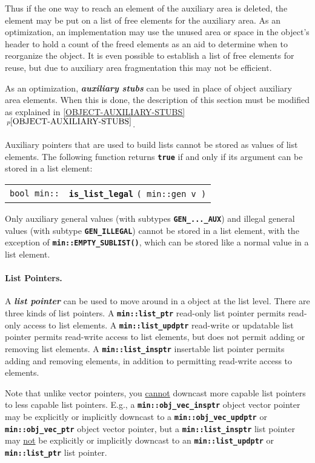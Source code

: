 \documentclass[12pt]{article}
\makeatletter
\newcommand{\subsubsubsection}[1]{\paragraph[#1]{#1.}}
\newcommand{\TT}[1]{{\tt \bfseries #1}}
\newcommand{\key}[1]{{\bf \em #1}\index{#1}}
\newcommand{\skey}[2]{{\bf \em #1#2}\index{#1}}
\newcommand{\ttindex}[1]{\index{#1@{\tt #1}}}
\newcommand{\itemref}[1]{\ref{#1}$\,^{p\pageref{#1}}$}
\newcommand{\EOL}{\penalty \exhyphenpenalty}
\newenvironment{indpar}[1][0.3in]%
	{\begin{list}{}%
		     {\setlength{\itemsep}{0in}%
		      \setlength{\topsep}{0in}%
		      \setlength{\parsep}{1ex}%
		      \setlength{\labelwidth}{#1}%
		      \setlength{\leftmargin}{#1}%
		      \addtolength{\leftmargin}{\labelsep}}%
	 \item}%
	{\end{list}}
\newcommand{\LABEL}[1]{\label{#1}}
\newcommand{\MINKEY}[1]%
	   {\TT{#1}\ttindex{min::#1}\ttindex{#1}}
\makeatother
\begin{document}
Thus if the one way to reach an element of
the auxiliary area is deleted, the element may be put on a list of
free elements for the auxiliary area.  As an optimization,
an implementation may use the unused area or space in the object's header
to hold a count of the freed elements as an aid to determine when to
reorganize the object.  It is even possible to establish a list of
free elements for reuse, but due to auxiliary area fragmentation this
may not be efficient.

As an optimization, \skey{auxiliary stub}s can be used in place of object
auxiliary area elements.  When this is done, the description of this
section must be modified as explained in \itemref{OBJECT-AUXILIARY-STUBS}.

Auxiliary pointers that are used to build lists cannot be stored as
values of list elements.  The following function returns \TT{true}
if and only if its argument can be stored in a list element:

\begin{indpar}\begin{tabular}{r@{}l}
\verb|bool min::|
	& \MINKEY{is\_list\_legal} \verb|( min::gen v )|
\LABEL{MIN::IS_LIST_LEGAL} \\
\end{tabular}\end{indpar}

Only auxiliary general values (with subtypes \TT{GEN\_...\_AUX})
and illegal general values (with subtype \TT{GEN\_ILLEGAL}) cannot be stored
in a list element, with the exception of \TT{min::\EOL EMPTY\_\EOL SUBLIST()},
which can be stored like a normal value in a list element.

\subsubsubsection{List Pointers}
\label{LIST-POINTERS}

A \key{list pointer} can be used to move around in a object at
the list level.
There are three kinds of list pointers.
A \TT{min::list\_ptr} read-only list pointer permits read-only access to list
elements.
A \TT{min::\EOL list\_\EOL updptr} read-write or updatable list pointer
permits read-write access to list elements, but does not permit
adding or removing list elements.
A \TT{min::\EOL list\_\EOL insptr} insertable list pointer
permits adding and removing elements, in addition to permitting
read-write access to elements.

Note that unlike vector pointers, you \underline{cannot} downcast more capable
list pointers to less capable list pointers.  E.g., a
\TT{min::\EOL obj\_\EOL vec\_\EOL insptr} object vector pointer may be
explicitly or implicitly downcast to a
\TT{min::\EOL obj\_\EOL vec\_\EOL updptr}
or \TT{min::\EOL obj\_\EOL vec\_\EOL ptr} object vector pointer, but 
a \TT{min::\EOL list\_\EOL insptr} list pointer may \underline{not} be
explicitly or implicitly downcast to an
\TT{min::\EOL list\_\EOL updptr}
or \TT{min::\EOL list\_\EOL ptr} list pointer.
\end{document}
